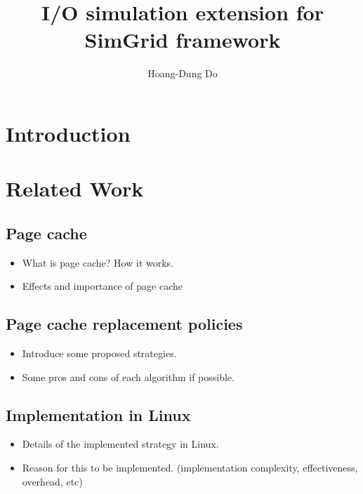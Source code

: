 \documentclass[11pt, a4paper]{article}
\begin{document}
\title{I/O simulation extension for SimGrid framework}
\author{Hoang-Dung Do}
\maketitle

\begin{abstract}

\end{abstract}

	\section{Introduction}

	\section{Related Work}

		\subsection{Page cache}
			\begin{itemize}
				\item What is page cache? How it works.
				\item Effects and importance of page cache
			\end{itemize}					
				
		\subsection{ Page cache replacement policies}
			\begin{itemize}
				\item Introduce some proposed strategies.
				\item Some pros and cons of each algorithm if possible.
			\end{itemize}

		\subsection{Implementation in Linux}
			\begin{itemize}
				\item Details of the implemented strategy in Linux.
				\item Reason for this to be implemented. (implementation complexity, effectiveness, overhead, etc)
			\end{itemize}
\end{document}
